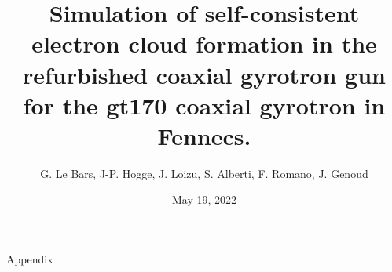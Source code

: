 \documentclass[aspectratio=169]{beamer}
\author[guillaume.lebars@epfl.ch]{\scriptsize{G. Le Bars, J-P. Hogge, J. Loizu, S. Alberti, F. Romano, J. Genoud}}
\date{May 19, 2022}
\title[]{\small{Simulation of self-consistent electron cloud formation in the refurbished coaxial gyrotron gun for the gt170 coaxial gyrotron in Fennecs.}}
\begin{document}
%
\frame{\titlepage}


\appendix

\begin{frame}
	\begin{center}
		\Large{Appendix}
	\end{center}
\end{frame}

%
\end{document}
